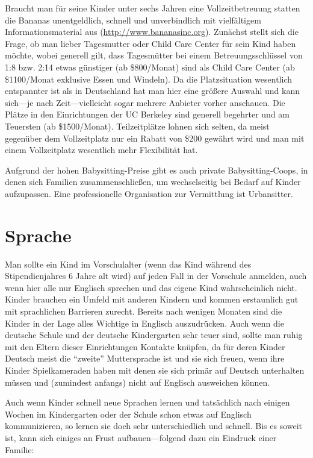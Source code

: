 \documentclass[a4paper]{scrreprt}
\begin{document}
Braucht man für seine Kinder unter sechs Jahren eine Vollzeitbetreuung statten die Bananas unentgeldlich, schnell und unverbindlich mit vielfältigem Informationsmaterial aus (\url{http://www.bananasinc.org}). Zunächst stellt sich die Frage, ob man lieber Tagesmutter oder Child Care Center für sein Kind haben möchte, wobei generell gilt, dass Tagesmütter bei einem Betreuungsschlüssel von 1:8 bzw. 2:14 etwas günstiger (ab \$800/Monat) sind als Child Care Center (ab \$1100/Monat exklusive Essen und Windeln). Da die Platzsituation wesentlich entspannter ist als in Deutschland hat man hier eine größere Auswahl und kann sich---je nach Zeit---vielleicht sogar mehrere Anbieter vorher anschauen. Die Plätze in den Einrichtungen der UC Berkeley sind generell begehrter und am Teuersten (ab \$1500/Monat). Teilzeitplätze lohnen sich selten, da meist gegenüber dem Vollzeitplatz nur ein Rabatt von \$200 gewährt wird und man mit einem Vollzeitplatz wesentlich mehr Flexibilität hat. 

Aufgrund der hohen Babysitting-Preise gibt es auch private Babysitting-Coops, in denen sich Familien zusammenschließen, um wechselseitig bei Bedarf auf Kinder aufzupassen.
Eine professionelle Organisation zur Vermittlung ist Urbansitter.

\section{Sprache}

Man sollte ein Kind im Vorschulalter (wenn das Kind während des Stipendienjahres 6 Jahre alt wird) auf jeden Fall in der Vorschule anmelden, auch wenn hier alle nur Englisch sprechen und das eigene Kind wahrscheinlich nicht. Kinder brauchen ein Umfeld mit anderen Kindern und kommen erstaunlich gut mit sprachlichen Barrieren zurecht. Bereits nach wenigen Monaten sind die Kinder in der Lage alles Wichtige in Englisch auszudrücken. Auch wenn die deutsche Schule und der deutsche Kindergarten sehr teuer sind, sollte man ruhig mit den Eltern dieser Einrichtungen Kontakte knüpfen, da für deren Kinder Deutsch meist die "`zweite"' Muttersprache ist und sie sich freuen, wenn ihre Kinder Spielkameraden haben mit denen sie sich primär auf Deutsch unterhalten müssen und (zumindest anfangs) nicht auf Englisch ausweichen können.

Auch wenn Kinder schnell neue Sprachen lernen und tatsächlich nach einigen Wochen im Kindergarten oder der Schule schon etwas auf Englisch kommunizieren, so lernen sie doch sehr unterschiedlich und schnell. Bis es soweit ist, kann sich einiges an Frust aufbauen---folgend dazu ein Eindruck einer Familie:
\end{document}
